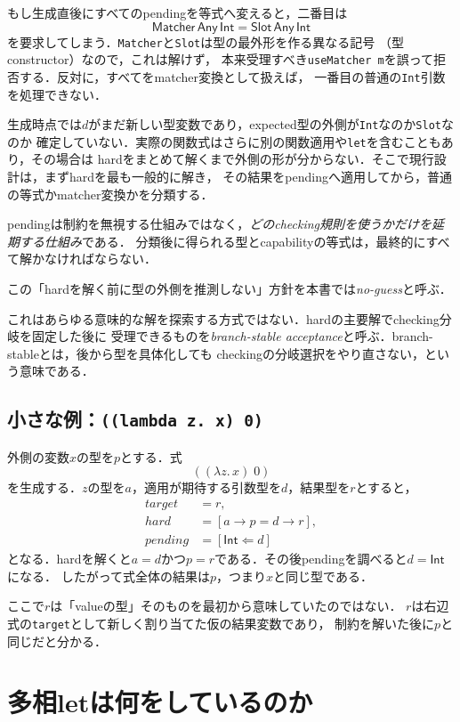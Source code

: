 \documentclass[11pt,a4paper,oneside]{ltjsbook}
\newcommand{\code}[1]{\texttt{#1}}
\newcommand{\checks}{\mathrel{\Leftarrow}}
\newcommand{\TyInt}{\mathsf{Int}}
\newcommand{\Matcher}{\mathsf{Matcher}}
\newcommand{\Slot}{\mathsf{Slot}}
\newcommand{\fn}{\mathbin{\to}}
\begin{document}
もし生成直後にすべてのpendingを等式へ変えると，二番目は
\[
  \Matcher\,\mathsf{Any}\,\TyInt
  =
  \Slot\,\mathsf{Any}\,\TyInt
\]
を要求してしまう．\code{Matcher}と\code{Slot}は型の最外形を作る異なる記号
（型constructor）なので，これは解けず，
本来受理すべき\code{useMatcher m}を誤って拒否する．反対に，すべてをmatcher変換として扱えば，
一番目の普通の\code{Int}引数を処理できない．

生成時点では$d$がまだ新しい型変数であり，expected型の外側が\code{Int}なのか\code{Slot}なのか
確定していない．実際の関数式はさらに別の関数適用や\code{let}を含むこともあり，その場合は
hardをまとめて解くまで外側の形が分からない．そこで現行設計は，まずhardを最も一般的に解き，
その結果をpendingへ適用してから，普通の等式かmatcher変換かを分類する．

pendingは制約を無視する仕組みではなく，\emph{どのchecking規則を使うかだけを延期する仕組み}である．
分類後に得られる型とcapabilityの等式は，最終的にすべて解かなければならない．

この「hardを解く前に型の外側を推測しない」方針を本書では\emph{no-guess}と呼ぶ．

これはあらゆる意味的な解を探索する方式ではない．hardの主要解でchecking分岐を固定した後に
受理できるものを\emph{branch-stable acceptance}と呼ぶ．branch-stableとは，後から型を具体化しても
checkingの分岐選択をやり直さない，という意味である．

\section{小さな例：\code{((lambda z. x) 0)}}

外側の変数$x$の型を$p$とする．式
\[
  ((\lambda z.\,x)\;0)
\]
を生成する．$z$の型を$a$，適用が期待する引数型を$d$，結果型を$r$とすると，
\[
\begin{aligned}
  \mathit{target}  &= r,\\
  \mathit{hard}    &= [a\fn p = d\fn r],\\
  \mathit{pending} &= [\TyInt\checks d]
\end{aligned}
\]
となる．hardを解くと$a=d$かつ$p=r$である．その後pendingを調べると$d=\TyInt$になる．
したがって式全体の結果は$p$，つまり$x$と同じ型である．

ここで$r$は「valueの型」そのものを最初から意味していたのではない．
$r$は右辺式の\code{target}として新しく割り当てた仮の結果変数であり，
制約を解いた後に$p$と同じだと分かる．

\chapter{多相letは何をしているのか}
\end{document}
